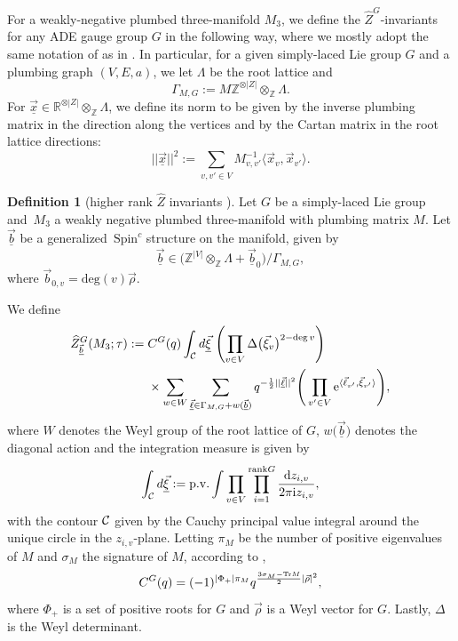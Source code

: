\documentclass[pdftex]{sigma}
\def\BR{\mathbb{R}}
\def\BZ{\mathbb{Z}}
\def\ex{{\rm e}}
\theoremstyle{definition}
\newtheorem{defn}[thm]{Definition}
\numberwithin{equation}{section}
\begin{document}
For a weakly-negative plumbed three-manifold $M_3$, we define the $\widehat Z^G$-invariants for any ADE gauge group $G$ in the following way, where we mostly adopt the same notation of as in \cite{chengUpC}. In particular, for a given simply-laced Lie group $G$ and a plumbing graph $(V,E,a)$, we let $\Lambda$ be the root lattice and
\begin{equation*}
 \Gamma_{M,G}:=M\BZ^{\otimes |Z|}\otimes_{\BZ} \Lambda .
\end{equation*}
For $\vec{\underline{x}}\in\BR^{\otimes |Z|}\otimes_{\BZ} \Lambda $, we define its norm to be given by the inverse plumbing matrix in the direction along the vertices and by the Cartan matrix in the root lattice directions:
\begin{equation*}
|| \underline{\vec{x}} ||^2 := \sum_{v,v'\in V} M^{-1}_{v,v'} \langle \vec{x}_v, \vec{x}_{v'} \rangle.
\end{equation*}

\begin{defn}[higher rank $\widehat Z$ invariants \cite{chengUpC, Chung:2018rea,Park:2019xey}]\label{dfn:blocks}
 Let $G$ be a simply-laced Lie group and~$M_3$ a weakly negative plumbed three-manifold with plumbing matrix $M$. Let $\vec{\underline{b}}$ be a generalized~$\text{Spin}^c$ structure on the manifold, given by
 \begin{equation}
\vec{\underline{b}}\in \bigl(\BZ^{|V|} \otimes_\BZ \Lambda +\vec{\underline{b}}_0\bigr) /
\Gamma_{M,G},
\label{eq:bfromcoker}
\end{equation}
where $ \vec{b}_{0,v}=\mathrm{deg}(v)\vec\rho$.

We define
 \begin{align}
\widehat{Z}^G_{\underline{\vec{b}}}(M_3;\tau) :={}&C^G(q) \int_{\cal C} d \underline{\vec{\xi}}\,\left( \prod_{v \in V} \Delta\bigl(\vec{\xi}_v\bigr)^{2 - \deg v} \right)\nonumber\\
&\times
 \sum_{w \in {W}} \sum_{\underline{\vec{\ell}} \in \Gamma_{M,G} +w(\underline{\vec{b}}) } q^{-\frac{1}{2}|| \underline{\vec{\ell}}||^2}
 \Bigg( \prod_{v' \in V} \ex^{\langle \vec{\ell}_{v'}, \vec{\xi}_{v'} \rangle} \Bigg),\label{def:ZhatHR-3mfdvoa}
 \end{align}
 where $W$ denotes the Weyl group of the root lattice of $G$, $w\bigl(\underline{\vec{b}}\bigr) $ denotes the diagonal action  and the integration measure is given by
 \[
 \int_{\cal C} d \underline{\vec{\xi}} :={\rm p.v.} \int\prod_{v\in V} \prod_{i =1}^{\text{rank}G} {\frac{{\rm d}z_{i,v}}{2\pi {\rm i} z_{i,v}}},
\]
 with the contour ${\cal C}$ given by the Cauchy principal value integral around the unique circle in the $z_{i,v}$-plane.
 Letting $\pi_M$ be the number of positive eigenvalues of $M$ and $\sigma_M$ the signature of $M$, according to \cite{Park:2019xey},
 \[%
 C^G(q)= (-1)^{|\Phi_+|\pi_M}q^{{\frac{3\sigma_M-{\rm Tr} M}{2}} |\vec \rho|^2},
 \]
 where $ \Phi_+$ is a set of positive roots for $G$ and $\vec \rho$ is a Weyl vector for $G$. Lastly, $\Delta$ is the Weyl determinant.
\end{defn}
\end{document}
